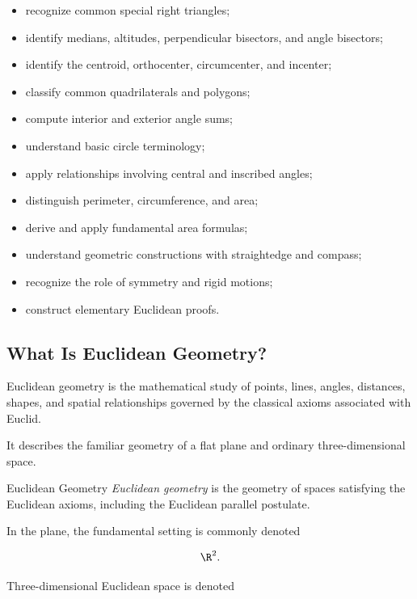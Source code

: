 {\begin{itemize}
    \item recognize common special right triangles;
    \item identify medians, altitudes, perpendicular bisectors, and angle bisectors;
    \item identify the centroid, orthocenter, circumcenter, and incenter;
    \item classify common quadrilaterals and polygons;
    \item compute interior and exterior angle sums;
    \item understand basic circle terminology;
    \item apply relationships involving central and inscribed angles;
    \item distinguish perimeter, circumference, and area;
    \item derive and apply fundamental area formulas;
    \item understand geometric constructions with straightedge and compass;
    \item recognize the role of symmetry and rigid motions;
    \item construct elementary Euclidean proofs.
\end{itemize}
}

\subsection{What Is Euclidean Geometry?}
\label{subsec:what-is-euclidean-geometry}

Euclidean geometry is the mathematical study of points, lines, angles,
distances, shapes, and spatial relationships governed by the classical
axioms associated with Euclid.

It describes the familiar geometry of a flat plane and ordinary
three-dimensional space.

\begin{definitionbox}{Euclidean Geometry}
\emph{Euclidean geometry} is the geometry of spaces satisfying the
Euclidean axioms, including the Euclidean parallel postulate.
\end{definitionbox}

In the plane, the fundamental setting is commonly denoted

\[ \R^2. \]

Three-dimensional Euclidean space is denoted

